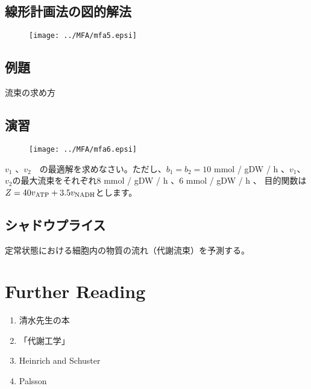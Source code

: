 \subsection{線形計画法の図的解法}
\begin{figure}[h]
\begin{center}
\texttt{[image: ../MFA/mfa5.epsi]}
\end{center}
\end{figure}

\subsection{例題}
流束の求め方

\subsection{演習}
\begin{figure}[h]
\begin{center}
\texttt{[image: ../MFA/mfa6.epsi]}
\end{center}
\end{figure}

\(v_1\) 、\(v_2\)　の最適解を求めなさい。ただし、\(b_1 = b_2 = 10\) mmol / gDW / h 、\(v_1\)、\(v_2\)の最大流束をそれぞれ8 mmol / gDW / h 、6 mmol / gDW / h 、
目的関数は \(Z = 40 v_{\rm ATP} + 3.5 v_{\rm NADH}\)とします。

\subsection{シャドウプライス}

定常状態における細胞内の物質の流れ（代謝流束）を予測する。



\section{Further Reading}
\begin{enumerate}
\item 清水先生の本
\item 「代謝工学」
\item Heinrich and Schuster
\item Palsson
\end{enumerate}
